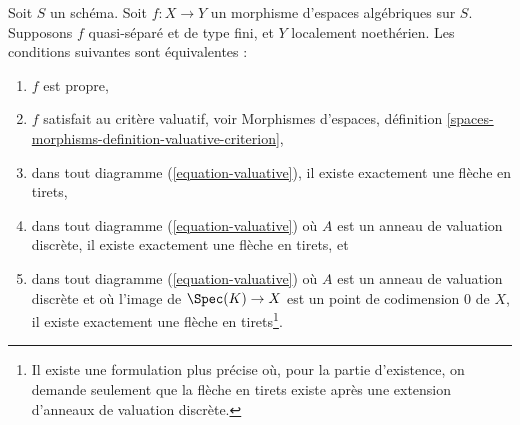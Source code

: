 \begin{lemma}
\label{lemma-Noetherian-dvr-valuative-proper}
Soit $S$ un schéma. Soit $f : X \to Y$ un morphisme d'espaces algébriques
sur $S$. Supposons $f$ quasi-séparé et de type fini, et $Y$
localement noethérien. Les conditions suivantes sont équivalentes :
\begin{enumerate}
\item $f$ est propre,
\item $f$ satisfait au critère valuatif, voir
Morphismes d'espaces, définition
\ref{spaces-morphisms-definition-valuative-criterion},
\item dans tout diagramme (\ref{equation-valuative}), il existe exactement
une flèche en tirets,
\item dans tout diagramme (\ref{equation-valuative}) où $A$ est un anneau de
valuation discrète, il existe exactement une flèche en tirets, et
\item dans tout diagramme (\ref{equation-valuative}) où $A$ est un anneau de
valuation discrète et où l'image de $\Spec(K) \to X$ est un point de
codimension $0$ de $X$, il existe exactement une flèche en tirets\footnote{Il existe
une formulation plus précise où, pour la partie d'existence, on demande seulement que
la flèche en tirets existe après une extension d'anneaux de valuation discrète.}.
\end{enumerate}
\end{lemma}

